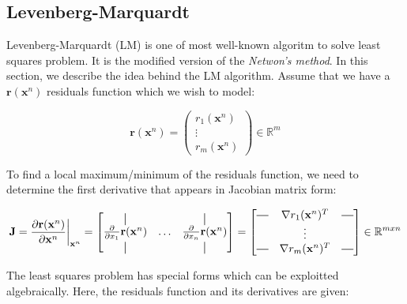 \documentclass[a4paper]{report}
\numberwithin{figure}{section}
\newcommand{\R}{\mathbb{R}}
\newcommand*{\vertbar}{\rule[-1ex]{0.5pt}{2.5ex}}
\newcommand*{\horzbar}{\rule[.5ex]{2.5ex}{0.5pt}}
\begin{document}
\subsection{Levenberg-Marquardt}
Levenberg-Marquardt (LM) is one of most well-known algoritm 
to solve least squares problem. It is the modified version of the \textit{Netwon's method}. 
In this section, we describe the idea behind 
the LM algorithm. Assume that we have a $\mathbf{r}(\mathbf{x}^n)$ residuals function which we 
wish to model:

\begin{equation}
  \mathbf{r}(\mathbf{x}^n) = \begin{pmatrix} r_1(\mathbf{x}^n) \\ \vdots \\ r_m(\mathbf{x}^n) \end{pmatrix} \in \R^m
\end{equation}

To find a local maximum/minimum of the residuals function, we need to 
determine the first derivative that 
appears in Jacobian matrix form:

\begin{equation}
  \mathbf{J} = \frac{\partial \mathbf{r}(\mathbf{x}^n)}{\partial \mathbf{x}^n } \bigg|_{\mathbf{x}^n}
  = 
  \begin{bmatrix} 
    \vertbar & & \vertbar \\
    \frac{\partial}{\partial x_1}\mathbf{r}(\mathbf{x}^n) & \dots & \frac{\partial}{\partial x_n}\mathbf{r}(\mathbf{x}^n) \\
    \vertbar & & \vertbar
  \end{bmatrix}
  = 
  \begin{bmatrix}
    \horzbar & \nabla r_1(\mathbf{x}^n)^T & \horzbar \\
     & \vdots & \\
     \horzbar & \nabla r_m(\mathbf{x}^n)^T & \horzbar 
  \end{bmatrix}
  \in \R^{mxn}
\end{equation}

The least squares problem has special forms which can be exploitted algebraically.
Here, the residuals function and its derivatives are given:
\end{document}
